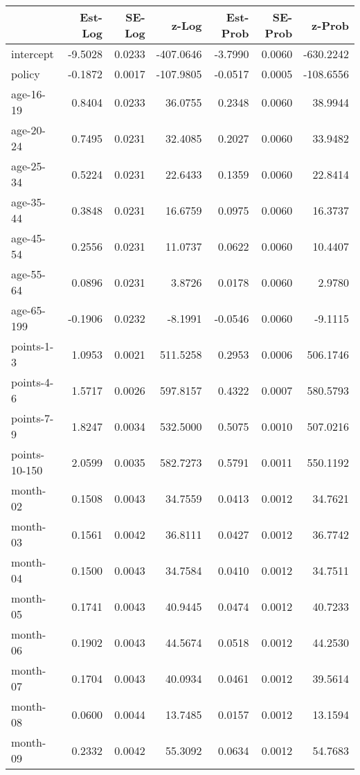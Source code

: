 \documentclass[10pt]{article}
\begin{document}
\begin{table}[ht]
\centering
\begin{tabular}{lrrrrrr}
  \hline
 & Est-Log & SE-Log & z-Log & Est-Prob & SE-Prob & z-Prob \\ 
  \hline
intercept & -9.5028 & 0.0233 & -407.0646 & -3.7990 & 0.0060 & -630.2242 \\ 
  policy & -0.1872 & 0.0017 & -107.9805 & -0.0517 & 0.0005 & -108.6556 \\ 
  age-16-19 & 0.8404 & 0.0233 & 36.0755 & 0.2348 & 0.0060 & 38.9944 \\ 
  age-20-24 & 0.7495 & 0.0231 & 32.4085 & 0.2027 & 0.0060 & 33.9482 \\ 
  age-25-34 & 0.5224 & 0.0231 & 22.6433 & 0.1359 & 0.0060 & 22.8414 \\ 
  age-35-44 & 0.3848 & 0.0231 & 16.6759 & 0.0975 & 0.0060 & 16.3737 \\ 
  age-45-54 & 0.2556 & 0.0231 & 11.0737 & 0.0622 & 0.0060 & 10.4407 \\ 
  age-55-64 & 0.0896 & 0.0231 & 3.8726 & 0.0178 & 0.0060 & 2.9780 \\ 
  age-65-199 & -0.1906 & 0.0232 & -8.1991 & -0.0546 & 0.0060 & -9.1115 \\ 
  points-1-3 & 1.0953 & 0.0021 & 511.5258 & 0.2953 & 0.0006 & 506.1746 \\ 
  points-4-6 & 1.5717 & 0.0026 & 597.8157 & 0.4322 & 0.0007 & 580.5793 \\ 
  points-7-9 & 1.8247 & 0.0034 & 532.5000 & 0.5075 & 0.0010 & 507.0216 \\ 
  points-10-150 & 2.0599 & 0.0035 & 582.7273 & 0.5791 & 0.0011 & 550.1192 \\ 
  month-02 & 0.1508 & 0.0043 & 34.7559 & 0.0413 & 0.0012 & 34.7621 \\ 
  month-03 & 0.1561 & 0.0042 & 36.8111 & 0.0427 & 0.0012 & 36.7742 \\ 
  month-04 & 0.1500 & 0.0043 & 34.7584 & 0.0410 & 0.0012 & 34.7511 \\ 
  month-05 & 0.1741 & 0.0043 & 40.9445 & 0.0474 & 0.0012 & 40.7233 \\ 
  month-06 & 0.1902 & 0.0043 & 44.5674 & 0.0518 & 0.0012 & 44.2530 \\ 
  month-07 & 0.1704 & 0.0043 & 40.0934 & 0.0461 & 0.0012 & 39.5614 \\ 
  month-08 & 0.0600 & 0.0044 & 13.7485 & 0.0157 & 0.0012 & 13.1594 \\ 
  month-09 & 0.2332 & 0.0042 & 55.3092 & 0.0634 & 0.0012 & 54.7683 \\ 

\end{tabular}
\end{table}
\end{document}
